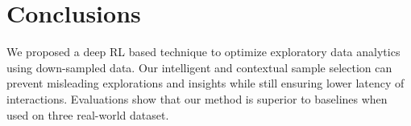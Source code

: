 \section{Conclusions}

We proposed a deep RL based technique to optimize exploratory data analytics using down-sampled data.  
Our intelligent and contextual sample selection can prevent misleading explorations and insights while still ensuring lower latency of interactions. Evaluations show that our method is superior to baselines when used on three real-world dataset.   
